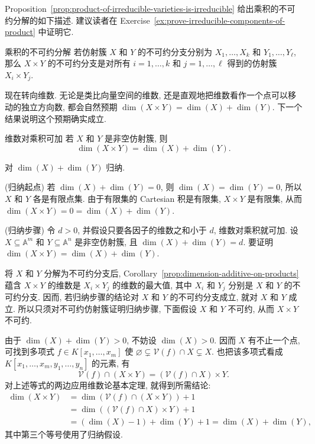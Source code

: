 Proposition~\ref{prop:product-of-irreducible-varieties-is-irreducible} 给出乘积的不可约分解的如下描述. 建议读者在 Exercise~\ref{ex:prove-irreducible-components-of-product} 中证明它.

\begin{Corollary}{乘积的不可约分解}\leavevmode\label{cor:irreducible-components-of-product}
若仿射簇 $X$ 和 $Y$ 的不可约分支分别为 $X_{1},\ldots,X_{k}$ 和 $Y_{1},\ldots,Y_{\ell}$, 那么 $X\times Y$ 的不可约分支是对所有 $i=1,\ldots,k$ 和 $j=1,\ldots,\ell$ 得到的仿射簇 $X_{i}\times Y_{j}$.
\end{Corollary}

现在转向维数. 无论是类比向量空间的维数, 还是直观地把维数看作一个点可以移动的独立方向数, 都会自然预期 $\dim(X\times Y)=\dim(X)+\dim(Y)$. 下一个结果说明这个预期确实成立.

\begin{Proposition}{维数对乘积可加}\leavevmode\label{prop:dimension-additive-on-products}
若 $X$ 和 $Y$ 是非空仿射簇, 则
\[
  \dim(X\times Y)=\dim(X)+\dim(Y).
\]
\end{Proposition}
\begin{Proof}
对 $\dim(X)+\dim(Y)$ 归纳.

(归纳起点) 若 $\dim(X)+\dim(Y)=0$, 则 $\dim(X)=\dim(Y)=0$, 所以 $X$ 和 $Y$ 各是有限点集. 由于有限集的 Cartesian 积是有限集, $X\times Y$ 是有限集, 从而 $\dim(X\times Y)=0=\dim(X)+\dim(Y)$.

(归纳步骤) 令 $d>0$, 并假设只要各因子的维数之和小于 $d$, 维数对乘积就可加. 设 $X\subseteq\mathbb{A}^{m}$ 和 $Y\subseteq\mathbb{A}^{n}$ 是非空仿射簇, 且 $\dim(X)+\dim(Y)=d$. 要证明 $\dim(X\times Y)=\dim(X)+\dim(Y)$.

将 $X$ 和 $Y$ 分解为不可约分支后, Corollary~\ref{prop:dimension-additive-on-products} 蕴含 $X\times Y$ 的维数是 $X_{i}\times Y_{j}$ 的维数的最大值, 其中 $X_{i}$ 和 $Y_{j}$ 分别是 $X$ 和 $Y$ 的不可约分支. 因而, 若归纳步骤的结论对 $X$ 和 $Y$ 的不可约分支成立, 就对 $X$ 和 $Y$ 成立. 所以只须对不可约仿射簇证明归纳步骤, 下面假设 $X$ 和 $Y$ 不可约, 从而 $X\times Y$ 不可约.

由于 $\dim(X)+\dim(Y)>0$, 不妨设 $\dim(X)>0$. 因而 $X$ 有不止一个点, 可找到多项式 $f\in K[x_{1},\ldots,x_{m}]$ 使 $\varnothing\subsetneq\mathcal{V}(f)\cap X\subsetneq X$. 也把该多项式看成 $K[x_{1},\ldots,x_{m},y_{1},\ldots,y_{n}]$ 的元素, 有
\[
  \mathcal{V}(f)\cap(X\times Y)=(\mathcal{V}(f)\cap X)\times Y.
\]
对上述等式的两边应用维数论基本定理, 就得到所需结论:
\[
  \begin{aligned}
    \dim(X\times Y)&=\dim(\mathcal{V}(f)\cap(X\times Y))+1\\
      &=\dim((\mathcal{V}(f)\cap X)\times Y)+1\\
      &=(\dim(X)-1)+\dim(Y)+1=\dim(X)+\dim(Y),
  \end{aligned}
\]
其中第三个等号使用了归纳假设.
\end{Proof}

